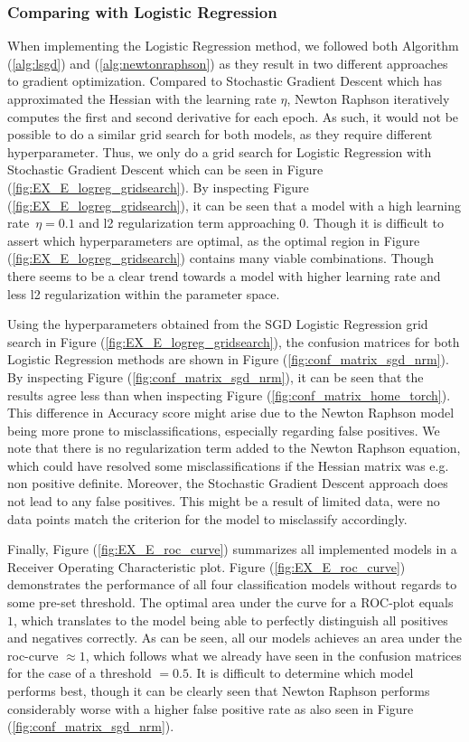 \documentclass
[twocolumn,
secnumarabic,
nobibnotes,
aps,
prl,
reprint,
groupedaddress,
amsmath,
amssymb
]{revtex4-2}
\begin{document}
\subsubsection{Comparing with Logistic Regression}
When implementing the Logistic Regression method, we followed both Algorithm (\ref{alg:lsgd}) and (\ref{alg:newtonraphson}) as they result in two different approaches to gradient optimization. %
Compared to Stochastic Gradient Descent which has approximated the Hessian with the learning rate $\eta$, Newton Raphson iteratively computes the first and second derivative for each epoch. As such, it would not be possible to do a similar grid search for both models, as they require different hyperparameter. Thus, we only do a grid search for Logistic Regression with Stochastic Gradient Descent which can be seen in Figure (\ref{fig:EX_E_logreg_gridsearch}). By inspecting Figure (\ref{fig:EX_E_logreg_gridsearch}), it can be seen that a model with a high learning rate $\eta = 0.1$ and l2 regularization term approaching 0. Though it is difficult to assert which hyperparameters are optimal, as the optimal region in Figure (\ref{fig:EX_E_logreg_gridsearch}) contains many viable combinations. Though there seems to be a clear trend towards a model with higher learning rate and less l2 regularization within the parameter space. 

Using the hyperparameters obtained from the SGD Logistic Regression grid search in Figure (\ref{fig:EX_E_logreg_gridsearch}), the confusion matrices for both Logistic Regression methods are shown in Figure (\ref{fig:conf_matrix_sgd_nrm}). By inspecting Figure (\ref{fig:conf_matrix_sgd_nrm}), it can be seen that the results agree less than when inspecting Figure (\ref{fig:conf_matrix_home_torch}). This difference in Accuracy score might arise due to the Newton Raphson model being more prone to misclassifications, especially regarding false positives. We note that there is no regularization term added to the Newton Raphson equation, which could have resolved some misclassifications if the Hessian matrix was e.g. non positive definite. Moreover, the Stochastic Gradient Descent approach does not lead to any false positives. This might be a result of limited data, were no data points match the criterion for the model to misclassify accordingly. 

Finally, Figure (\ref{fig:EX_E_roc_curve}) summarizes all implemented models in a Receiver Operating Characteristic plot. Figure (\ref{fig:EX_E_roc_curve}) demonstrates the performance of all four classification models without regards to some pre-set threshold. The optimal area under the curve for a ROC-plot equals $1$, which translates to the model being able to perfectly distinguish all positives and negatives correctly. As can be seen, all our models achieves an area under the roc-curve $\approx 1$, which follows what we already have seen in the confusion matrices for the case of a threshold $ = 0.5$. It is difficult to determine which model performs best, though it can be clearly seen that Newton Raphson performs considerably worse with a higher false positive rate as also seen in Figure (\ref{fig:conf_matrix_sgd_nrm}). 
\end{document}
